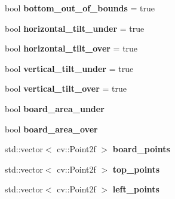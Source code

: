 \begin{DoxyCompactItemize}
\item 
\hypertarget{class_chessboard_aa15fcba3656e38be25ffa3507f6bb4ee}{}bool {\bfseries bottom\+\_\+out\+\_\+of\+\_\+bounds} = true\label{class_chessboard_aa15fcba3656e38be25ffa3507f6bb4ee}

\item 
\hypertarget{class_chessboard_a71743d34a3b481920b12911d124e4f8f}{}bool {\bfseries horizontal\+\_\+tilt\+\_\+under} = true\label{class_chessboard_a71743d34a3b481920b12911d124e4f8f}

\item 
\hypertarget{class_chessboard_aeeffb94596579ff45f1ca7015cb724c9}{}bool {\bfseries horizontal\+\_\+tilt\+\_\+over} = true\label{class_chessboard_aeeffb94596579ff45f1ca7015cb724c9}

\item 
\hypertarget{class_chessboard_a4a645e50f7b3f40f381854abbf2f45ab}{}bool {\bfseries vertical\+\_\+tilt\+\_\+under} = true\label{class_chessboard_a4a645e50f7b3f40f381854abbf2f45ab}

\item 
\hypertarget{class_chessboard_a362fcb984a0a7dd0f90d4d12ed71a3ea}{}bool {\bfseries vertical\+\_\+tilt\+\_\+over} = true\label{class_chessboard_a362fcb984a0a7dd0f90d4d12ed71a3ea}

\item 
\hypertarget{class_chessboard_ab81ab95920e11957774d0d831299fe5f}{}bool {\bfseries board\+\_\+area\+\_\+under}\label{class_chessboard_ab81ab95920e11957774d0d831299fe5f}

\item 
\hypertarget{class_chessboard_af1948e8b9d45efc716295808d7aa6ee0}{}bool {\bfseries board\+\_\+area\+\_\+over}\label{class_chessboard_af1948e8b9d45efc716295808d7aa6ee0}

\item 
\hypertarget{class_chessboard_aff5056bb3510926b3d5e896bdbed00a3}{}std\+::vector$<$ cv\+::\+Point2f $>$ {\bfseries board\+\_\+points}\label{class_chessboard_aff5056bb3510926b3d5e896bdbed00a3}

\item 
\hypertarget{class_chessboard_a218855537ee771c0ad557ff8142bb5c9}{}std\+::vector$<$ cv\+::\+Point2f $>$ {\bfseries top\+\_\+points}\label{class_chessboard_a218855537ee771c0ad557ff8142bb5c9}

\item 
\hypertarget{class_chessboard_a9c38d739b272a46321be0d2eea58b8b8}{}std\+::vector$<$ cv\+::\+Point2f $>$ {\bfseries left\+\_\+points}\label{class_chessboard_a9c38d739b272a46321be0d2eea58b8b8}


\end{DoxyCompactItemize}

